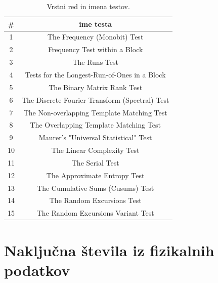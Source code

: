 \documentclass[11pt, oneside]{article}
\theoremstyle{definition}
\begin{document}
\begin{table}[h!]
    \begin{center}
        \begin{tabular}{c|c}
            \#              & ime testa                                      \\
            \hline \hline 1 & The Frequency (Monobit) Test                   \\
            \hline 2        & Frequency Test within a Block                  \\
            \hline 3        & The Runs Test                                  \\
            \hline 4        & Tests for the Longest-Run-of-Ones in a Block   \\
            \hline 5        & The Binary Matrix Rank Test                    \\
            \hline 6        & The Discrete Fourier Transform (Spectral) Test \\
            \hline 7        & The Non-overlapping Template Matching Test     \\
            \hline 8        & The Overlapping Template Matching Test         \\
            \hline 9        & Maurer's "Universal Statistical" Test          \\
            \hline 10       & The Linear Complexity Test                     \\
            \hline 11       & The Serial Test                                \\
            \hline 12       & The Approximate Entropy Test                   \\
            \hline 13       & The Cumulative Sums (Cusums) Test              \\
            \hline 14       & The Random Excursions Test                     \\
            \hline 15       & The Random Excursions Variant Test             \\
        \end{tabular}
    \end{center}
    \caption{Vrstni red in imena testov.}
    \label{tab: 2}
\end{table}

\section{Naključna števila iz fizikalnih podatkov}
\end{document}
